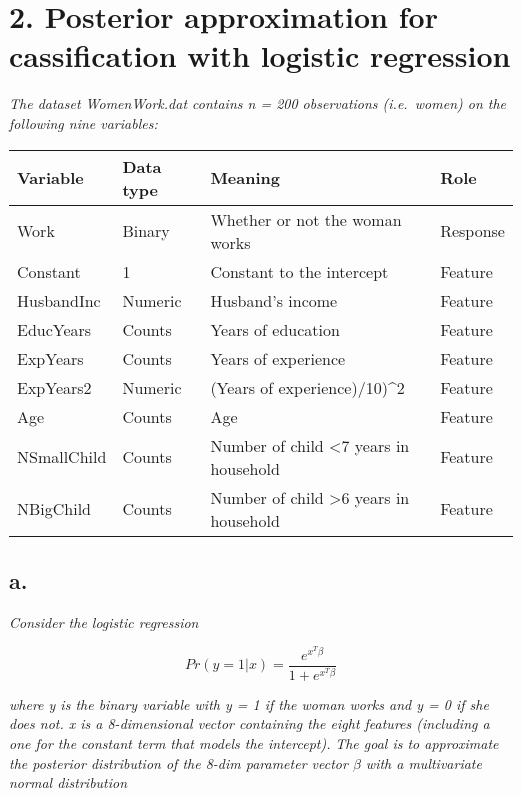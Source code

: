 \documentclass[]{article}
\begin{document}
\newpage

\hypertarget{posterior-approximation-for-cassification-with-logistic-regression}{%
\section{2. Posterior approximation for cassification with logistic
regression}\label{posterior-approximation-for-cassification-with-logistic-regression}}

\emph{The dataset WomenWork.dat contains n = 200 observations
(i.e.~women) on the following nine variables:}

\begin{table}[]
\begin{tabular}{l|l|l|l}
Variable    & Data type & Meaning                                           & Role     \\ \hline
Work        & Binary    & Whether or not the woman works                    & Response \\
Constant    & 1         & Constant to the intercept                         & Feature  \\
HusbandInc  & Numeric   & Husband's income                                  & Feature  \\
EducYears   & Counts    & Years of education                                & Feature  \\
ExpYears    & Counts    & Years of experience                               & Feature  \\
ExpYears2   & Numeric   & (Years of experience)/10)\textasciicircum{}2      & Feature  \\
Age         & Counts    & Age                                               & Feature  \\
NSmallChild & Counts    & Number of child \textless 7 years in household    & Feature  \\
NBigChild   & Counts    & Number of child \textgreater 6 years in household & Feature 
\end{tabular}
\end{table}

\hypertarget{a.-1}{%
\subsection{a.}\label{a.-1}}

\emph{Consider the logistic regression}

\[Pr(y=1|x)=\frac{e^{x^{T}\beta}}{1+e^{x^{T}\beta}}\]

\emph{where y is the binary variable with y = 1 if the woman works and y
= 0 if she does not. x is a 8-dimensional vector containing the eight
features (including a one for the constant term that models the
intercept).} \emph{The goal is to approximate the posterior distribution
of the 8-dim parameter vector \(\beta\) with a multivariate normal
distribution}
\end{document}
